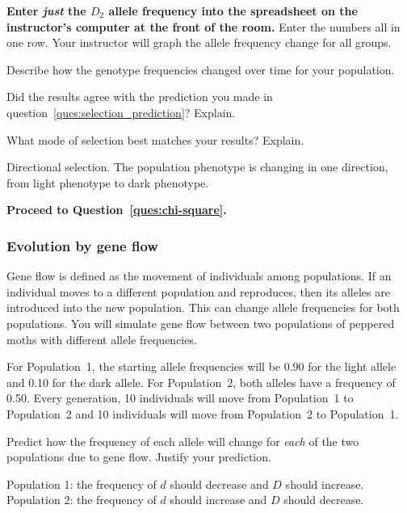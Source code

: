 \documentclass[12pt]{exam}
\newcommand*\AnswerBox[2]{%
    \parbox[t][#1]{0.92\textwidth}{%
    \begin{solution}#2\end{solution}}
    \vspace{\stretch{1}}
}
\newlength{\basespace}
\newcommand{\allele}[1]{$#1$}
\begin{document}
\begin{questions}
\question
\textbf{Enter \emph{just} the \allele{D_2} allele frequency into the spreadsheet on the instructor's
computer at the front of the room.}  Enter the numbers all 
in one row. Your instructor will graph the allele frequency change for all groups.


\question
Describe how the genotype frequencies changed over time for your population.

\AnswerBox{0.5\basespace}{%
}

\question
Did the results agree with the prediction you made in question~\ref{ques:selection_prediction}? Explain.

\AnswerBox{0.5\basespace}{%
}

\question[Checkout]
What mode of selection best matches your results? Explain.

\AnswerBox{0.5\basespace}{Directional selection. The population phenotype is changing in one direction, from light phenotype to dark phenotype.}

\textbf{Proceed to Question~\ref{ques:chi-square}.}
	
\subsubsection*{Evolution by gene flow}\label{sec:gene_flow}

Gene flow is defined as the movement of individuals among populations.  If an individual moves to a different population and reproduces, then its alleles are introduced into the new population.  This can change allele frequencies for both populations. You will simulate gene flow between two populations of peppered moths with different allele frequencies. 

For Population~1, the starting allele frequencies will be 0.90 for the light allele and 0.10 for the dark allele. For Population~2, both alleles have a frequency of 0.50. Every generation, 10 individuals will move from Population~1 to Population~2 and 10 individuals will move from Population~2 to Population~1.

\question\label{ques:migration_prediction}
Predict how the frequency of each allele will change for \emph{each} of the two populations due to gene flow. Justify your prediction.

\AnswerBox{3\baselineskip}{Population 1: the frequency of \allele{d} should decrease and \allele{D} should increase. Population 2: the frequency of \allele{d} should increase and \allele{D} should decrease.}


\end{questions}
\end{document}

